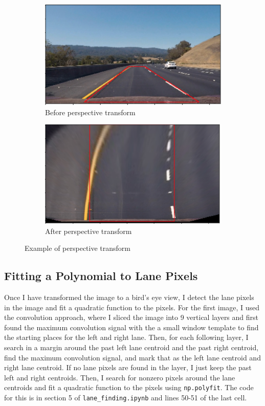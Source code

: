 \documentclass[12pt]{article}
\begin{document}
\begin{figure}[h]
\centering
\begin{subfigure}{.5\textwidth}
  \centering
  \includegraphics[width=1\linewidth]{src_pts.png}
  \caption{Before perspective transform}
\end{subfigure}%
\begin{subfigure}{.5\textwidth}
  \centering
  \includegraphics[width=1\linewidth]{warped_src_pts.png}
  \caption{After perspective transform}
  \label{fig:perspective}
\end{subfigure}
\caption{Example of perspective transform}
\end{figure}

\subsection{Fitting a Polynomial to Lane Pixels}
Once I have transformed the image to a bird's eye view, I detect the lane pixels in the image and fit a quadratic function to the pixels. For the first image, I used the convolution approach, where I sliced the image into 9 vertical layers and first found the maximum convolution signal with the a small window template to find the starting places for the left and right lane. Then, for each following layer, I search in a margin around the past left lane centroid and the past right centroid, find the maximum convolution signal, and mark that as the left lane centroid and right lane centroid. If no lane pixels are found in the layer, I just keep the past left and right centroids. Then, I search for nonzero pixels around the lane centroids and fit a quadratic function to the pixels using \texttt{np.polyfit}. The code for this is in section 5 of \texttt{lane\_finding.ipynb} and lines 50-51 of the last cell.
\end{document}
